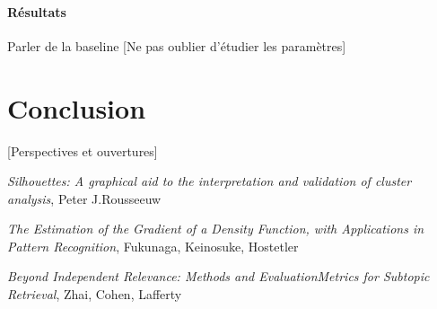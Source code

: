 \documentclass{article}
\begin{document}
\paragraph{Résultats}
Parler de la baseline
[Ne pas oublier d'étudier les paramètres]

\section{Conclusion}

[Perspectives et ouvertures]
\cite{lamport94}

\begin{thebibliography}{9}
\textit{Silhouettes: A graphical aid to the interpretation and validation of cluster analysis},
Peter J.Rousseeuw

\textit{The Estimation of the Gradient of a Density Function, with Applications in Pattern Recognition}, Fukunaga, Keinosuke, Hostetler

\textit{Beyond Independent Relevance: Methods and EvaluationMetrics for Subtopic Retrieval}, Zhai, Cohen, Lafferty

\end{thebibliography}
\end{document}
